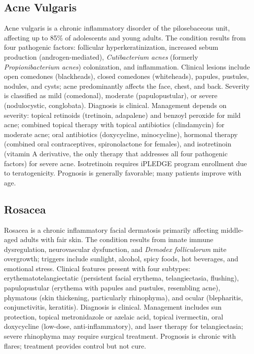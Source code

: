 \subsection{Acne Vulgaris}
\label{sec:Acne Vulgaris}
Acne vulgaris is a chronic inflammatory disorder of the pilosebaceous unit, affecting up to 85\% of adolescents and young adults. The condition results from four pathogenic factors: follicular hyperkeratinization, increased sebum production (androgen-mediated), \textit{Cutibacterium acnes} (formerly \textit{Propionibacterium acnes}) colonization, and inflammation. Clinical lesions include open comedones (blackheads), closed comedones (whiteheads), papules, pustules, nodules, and cysts; acne predominantly affects the face, chest, and back. Severity is classified as mild (comedonal), moderate (papulopustular), or severe (nodulocystic, conglobata). Diagnosis is clinical. Management depends on severity: topical retinoids (tretinoin, adapalene) and benzoyl peroxide for mild acne; combined topical therapy with topical antibiotics (clindamycin) for moderate acne; oral antibiotics (doxycycline, minocycline), hormonal therapy (combined oral contraceptives, spironolactone for females), and isotretinoin (vitamin A derivative, the only therapy that addresses all four pathogenic factors) for severe acne. Isotretinoin requires iPLEDGE program enrollment due to teratogenicity. Prognosis is generally favorable; many patients improve with age.

\subsection{Rosacea}
\label{sec:Rosacea}
Rosacea is a chronic inflammatory facial dermatosis primarily affecting middle-aged adults with fair skin. The condition results from innate immune dysregulation, neurovascular dysfunction, and \textit{Demodex folliculorum} mite overgrowth; triggers include sunlight, alcohol, spicy foods, hot beverages, and emotional stress. Clinical features present with four subtypes: erythematotelangiectatic (persistent facial erythema, telangiectasia, flushing), papulopustular (erythema with papules and pustules, resembling acne), phymatous (skin thickening, particularly rhinophyma), and ocular (blepharitis, conjunctivitis, keratitis). Diagnosis is clinical. Management includes sun protection, topical metronidazole or azelaic acid, topical ivermectin, oral doxycycline (low-dose, anti-inflammatory), and laser therapy for telangiectasia; severe rhinophyma may require surgical treatment. Prognosis is chronic with flares; treatment provides control but not cure.

